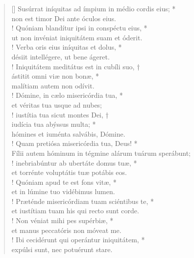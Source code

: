 \begin{verse}[\versewidth]
Susúrrat iníquitas ad ímpium in médio cordis eius; *\\
non est timor Dei ante óculos eius.\\!
\vin Quóniam blandítur ipsi in conspéctu eius, *\\
\vin ut non invéniat iniquitátem suam et óderit.\\!
Verba oris eius iníquitas et dolus, *\\
désiit intellégere, ut bene ágeret.\\!
\vin Iniquitátem meditátus est in cubíli suo, †\\
\vin ástitit omni viæ non bonæ, *\\
\vin malítiam autem non odívit.\\!
Dómine, in cælo misericórdia tua, *\\
et véritas tua usque ad nubes;\\!
\vin iustítia tua sicut montes Dei, †\\
\vin iudícia tua abýssus multa; *\\
\vin hómines et iuménta salvábis, Dómine.\\!
Quam pretiósa misericórdia tua, Deus! *\\
Fílii autem hóminum in tégmine alárum tuárum sperábunt;\\!
\vin inebriabúntur ab ubertáte domus tuæ, *\\
\vin et torrénte voluptátis tuæ potábis eos.\\!
Quóniam apud te est fons vitæ, *\\
et in lúmine tuo vidébimus lumen.\\!
\vin Præténde misericórdiam tuam sciéntibus te, *\\
\vin et iustítiam tuam his qui recto sunt corde.\\!
Non véniat mihi pes supérbiæ, *\\
et manus peccatóris non móveat me.\\!
\vin Ibi cecidérunt qui operántur iniquitátem, *\\
\vin expúlsi sunt, nec potuérunt stare.\\
\end{verse}
\vspace{1cm}


